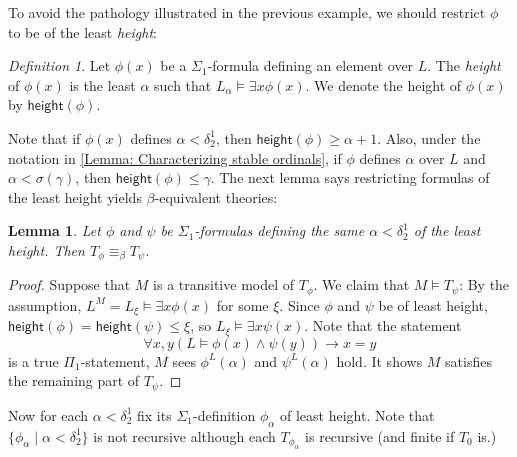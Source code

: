 \documentclass{amsart}
\newtheorem{lemma}[theorem]{Lemma}
\theoremstyle{remark}
\newtheorem{definition}[definition]{Definition}
\newcommand{\height}{\mathsf{height}}
\begin{document}
To avoid the pathology illustrated in the previous example, we should restrict $\phi$ to be of the least \emph{height}:
\begin{definition}
    Let $\phi(x)$ be a $\Sigma_1$-formula defining an element over $L$. The \emph{height} of $\phi(x)$ is the least $\alpha$ such that $L_\alpha\vDash \exists x \phi(x)$.
    We denote the height of $\phi(x)$ by $\height(\phi)$.
\end{definition}
Note that if $\phi(x)$ defines $\alpha<\delta^1_2$, then $\height(\phi) \ge \alpha+1$. Also, under the notation in \autoref{Lemma: Characterizing stable ordinals}, if $\phi$ defines $\alpha$ over $L$ and $\alpha < \sigma(\gamma)$, then $\height(\phi) \le \gamma$.
The next lemma says restricting formulas of the least height yields $\beta$-equivalent theories:
\begin{lemma}
    Let $\phi$ and $\psi$ be $\Sigma_1$-formulas defining the same $\alpha<\delta^1_2$ of the least height. Then $T_\phi\equiv_\beta T_\psi$.
\end{lemma}
\begin{proof}
    Suppose that $M$ is a transitive model of $T_\phi$. We claim that $M\vDash T_\psi$: By the assumption, $L^M=L_\xi\vDash \exists x \phi(x)$ for some $\xi$. Since $\phi$ and $\psi$ be of least height, $\height(\phi)=\height(\psi)\le \xi$, so $L_\xi \vDash \exists x\psi(x)$.
    Note that the statement
    \begin{equation*}
        \forall x,y (L\vDash \phi(x)\land\psi(y))\to x=y
    \end{equation*}
    is a true $\Pi_1$-statement, $M$ sees $\phi^L(\alpha)$ and $\psi^L(\alpha)$ hold. It shows $M$ satisfies the remaining part of $T_\psi$.
\end{proof}

Now for each $\alpha<\delta^1_2$ fix its $\Sigma_1$-definition $\phi_\alpha$ of least height. Note that $\{\phi_\alpha \mid \alpha<\delta^1_2\}$ is not recursive although each $T_{\phi_\alpha}$ is recursive (and finite if $T_0$ is.) 
\end{document}
